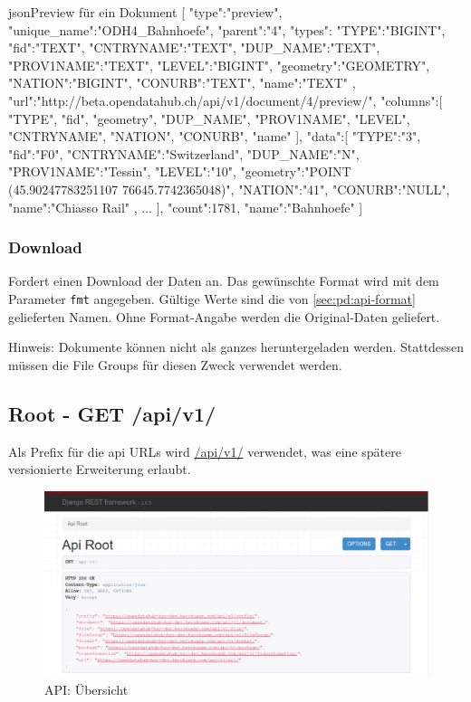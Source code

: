 \begin{srclst}{json}{Preview für ein Dokument}
[  
   {  
      "type":"preview",
      "unique_name":"ODH4_Bahnhoefe",
      "parent":"4",
      "types":{  
         "TYPE":"BIGINT",
         "fid":"TEXT",
         "CNTRYNAME":"TEXT",
         "DUP_NAME":"TEXT",
         "PROV1NAME":"TEXT",
         "LEVEL":"BIGINT",
         "geometry":"GEOMETRY",
         "NATION":"BIGINT",
         "CONURB":"TEXT",
         "name":"TEXT"
      },
      "url":"http://beta.opendatahub.ch/api/v1/document/4/preview/",
      "columns":[ "TYPE", "fid", "geometry", "DUP_NAME", "PROV1NAME", "LEVEL", "CNTRYNAME", "NATION", "CONURB", "name" ],
      "data":[  
         {  
            "TYPE":"3",
            "fid":"F0",
            "CNTRYNAME":"Switzerland",
            "DUP_NAME":"N",
            "PROV1NAME":"Tessin",
            "LEVEL":"10",
            "geometry":"POINT (45.90247783251107 76645.7742365048)",
            "NATION":"41",
            "CONURB":"NULL",
            "name":"Chiasso Rail"
         },
         ...
      ],
      "count":1781,
      "name":"Bahnhoefe"
   }
]
\end{srclst}

\subsubsection{Download} \label{sec:pd:api-download}
Fordert einen Download der Daten an. Das gewünschte Format wird mit dem Parameter \texttt{fmt} angegeben. Gültige Werte sind die von \cref{sec:pd:api-format} gelieferten Namen. Ohne Format-Angabe werden die Original-Daten geliefert.

Hinweis: Dokumente können nicht als ganzes heruntergeladen werden. Stattdessen müssen die File Groups für diesen Zweck verwendet werden.

\subsection{Root - GET /api/v1/}
Als Prefix für die \gls{api} URLs wird \url{/api/v1/} verwendet, was eine spätere versionierte Erweiterung erlaubt.
\begin{figure}[H]
\centering
\includegraphics[width=\linewidth]{fig/api-root}
\caption{API: Übersicht}
\label{fig:pd:api-root}
\end{figure}

